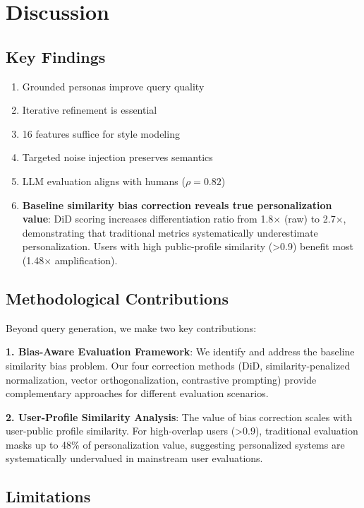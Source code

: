 \documentclass[11pt]{article}
\begin{document}
\section{Discussion}

\subsection{Key Findings}

\begin{enumerate}
    \item Grounded personas improve query quality
    \item Iterative refinement is essential
    \item 16 features suffice for style modeling
    \item Targeted noise injection preserves semantics
    \item LLM evaluation aligns with humans ($\rho=0.82$)
    \item \textbf{Baseline similarity bias correction reveals true personalization value}: DiD scoring increases differentiation ratio from 1.8$\times$ (raw) to 2.7$\times$, demonstrating that traditional metrics systematically underestimate personalization. Users with high public-profile similarity (>0.9) benefit most (1.48$\times$ amplification).
\end{enumerate}

\subsection{Methodological Contributions}

Beyond query generation, we make two key contributions:

\textbf{1. Bias-Aware Evaluation Framework}: We identify and address the baseline similarity bias problem. Our four correction methods (DiD, similarity-penalized normalization, vector orthogonalization, contrastive prompting) provide complementary approaches for different evaluation scenarios.

\textbf{2. User-Profile Similarity Analysis}: The value of bias correction scales with user-public profile similarity. For high-overlap users (>0.9), traditional evaluation masks up to 48\% of personalization value, suggesting personalized systems are systematically undervalued in mainstream user evaluations.

\subsection{Limitations}
\end{document}
